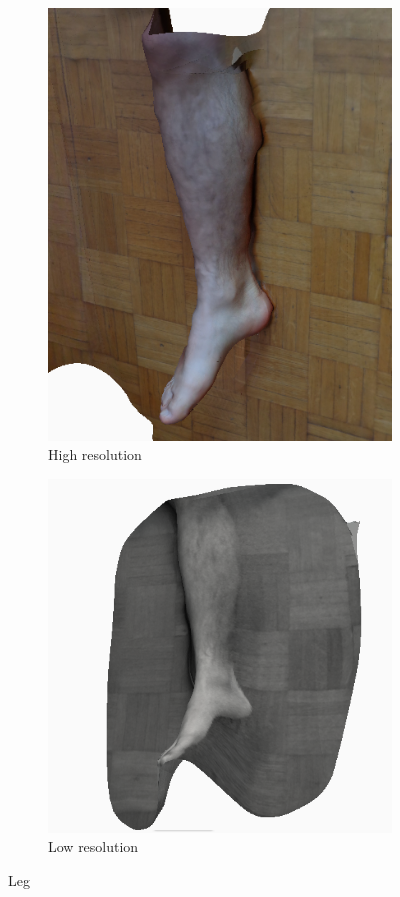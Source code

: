 \begin{figure}
\begin{subfigure}{.5\textwidth}
  \centering
  \includegraphics[width=0.8\linewidth]{images/leg-high.png}
  \caption{High resolution}
  \label{fig:leg-high}
\end{subfigure}
\begin{subfigure}{.5\textwidth}
  \centering
  \includegraphics[width=0.8\linewidth]{images/leg-low.png}
  \caption{Low resolution}
  \label{fig:leg-low}
\end{subfigure}
\caption{Leg}
\label{fig:leg}
\end{figure}


